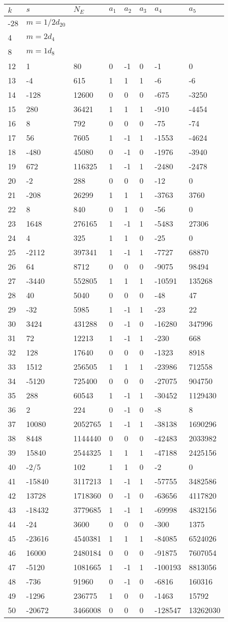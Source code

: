 \documentclass{amsart}
\begin{document}
\begin{longtable}{|l|l|l|lllll|}
\hline
$k$ & $s$ & $N_E$ & $a_1$ & $a_2$ & $a_3$ & $a_4$ & $a_5$\\
\hline
-28&$m=1/2d_{20}$&&\multicolumn{5}{c|}{}\\
4&$m=2d_{4}$&&\multicolumn{5}{c|}{}\\
8&$m=1d_{8}$&&\multicolumn{5}{c|}{}\\
12&1&80&0&-1&0&-1&0\\
13&-4&615&1&1&1&-6&-6\\
14&-128&12600&0&0&0&-675&-3250\\
15&280&36421&1&1&1&-910&-4454\\
16&8&792&0&0&0&-75&-74\\
17&56&7605&1&-1&1&-1553&-4624\\
18&-480&45080&0&-1&0&-1976&-3940\\
19&672&116325&1&-1&1&-2480&-2478\\
20&-2&288&0&0&0&-12&0\\
21&-208&26299&1&1&1&-3763&3760\\
22&8&840&0&1&0&-56&0\\
23&1648&276165&1&-1&1&-5483&27306\\
24&4&325&1&1&0&-25&0\\
25&-2112&397341&1&-1&1&-7727&68870\\
26&64&8712&0&0&0&-9075&98494\\
27&-3440&552805&1&1&1&-10591&135268\\
28&40&5040&0&0&0&-48&47\\
29&-32&5985&1&-1&1&-23&22\\
30&3424&431288&0&-1&0&-16280&347996\\
31&72&12213&1&-1&1&-230&668\\
32&128&17640&0&0&0&-1323&8918\\
33&1512&256505&1&1&1&-23986&712558\\
34&-5120&725400&0&0&0&-27075&904750\\
35&288&60543&1&-1&1&-30452&1129430\\
36&2&224&0&-1&0&-8&8\\
37&10080&2052765&1&-1&1&-38138&1690296\\
38&8448&1144440&0&0&0&-42483&2033982\\
39&15840&2544325&1&1&1&-47188&2425156\\
40&-2/5&102&1&1&0&-2&0\\
41&-15840&3117213&1&-1&1&-57755&3482586\\
42&13728&1718360&0&-1&0&-63656&4117820\\
43&-18432&3779685&1&-1&1&-69998&4832156\\
44&-24&3600&0&0&0&-300&1375\\
45&-23616&4540381&1&1&1&-84085&6524026\\
46&16000&2480184&0&0&0&-91875&7607054\\
47&-5120&1081665&1&-1&1&-100193&8813056\\
48&-736&91960&0&-1&0&-6816&160316\\
49&-1296&236775&1&0&0&-1463&15792\\
50&-20672&3466008&0&0&0&-128547&13262030\\
\hline
\end{longtable}
\end{document}
